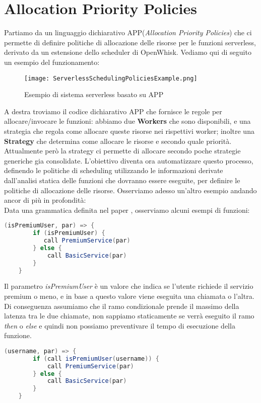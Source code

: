 \documentclass[../../main.tex]{subfiles}
\begin{document}
\section{Allocation Priority Policies}
Partiamo da un linguaggio dichiarativo APP(\textit{Allocation Priority Policies})\autocite{de2020allocation} che ci permette di definire politiche di allocazione delle risorse per le funzioni serverless, derivato da un estensione dello scheduler di OpenWhisk.
Vediamo qui di seguito un esempio del funzionamento:
\begin{figure}[H]
   \centering
    \texttt{[image: ServerlessSchedulingPoliciesExample.png]}
    \caption{Esempio di sistema serverless basato su APP}
\end{figure}
A destra troviamo il codice dichiarativo APP che fornisce le regole per allocare/invocare le funzioni: abbiamo due \textbf{Workers} che sono disponibili, e una strategia che regola come allocare queste risorse nei rispettivi worker; inoltre una \textbf{Strategy} che determina come allocare le risorse e secondo quale priorità.
Attualmente però la strategy ci permette di allocare secondo poche strategie generiche gia consolidate.
L'obiettivo diventa ora automatizzare questo processo, definendo le politiche di scheduling utilizzando le informazioni derivate dall'analisi statica delle funzioni che dovranno essere eseguite, per definire le politiche di allocazione delle risorse.
Osserviamo adesso un'altro esempio andando ancor di più in profondità:\\
Data una grammatica definita nel paper \autocite {deserverless}, osserviamo alcuni esempi di funzioni:
\begin{lstlisting}[language=Java, caption= La guardia della condizione è un espressione,label={lst:1}]
    (isPremiumUser, par) => {
        if (isPremiumUser) {
           call PremiumService(par)
        } else {
            call BasicService(par)
        }
    }
\end{lstlisting}

Il parametro \textit{isPremiumUser} è un valore che indica se l'utente richiede il servizio premium o meno, e in base a questo valore viene eseguita una chiamata o l'altra.
Di conseguenza assumiamo che il ramo condizionale prende il massimo della latenza tra le due chiamate, non sappiamo staticamente se verrà eseguito il ramo \textit{then} o \textit{else} e quindi non possiamo preventivare il tempo di esecuzione della funzione.

\begin{lstlisting}[language=Java, caption= La guardia della condizione è un'invocazione a un servizio esterno,label={lst:2}]
    (username, par) => {
        if (call isPremiumUser(username)) {
            call PremiumService(par)
        } else {
            call BasicService(par)
        }
    }
\end{lstlisting}
\end{document}
